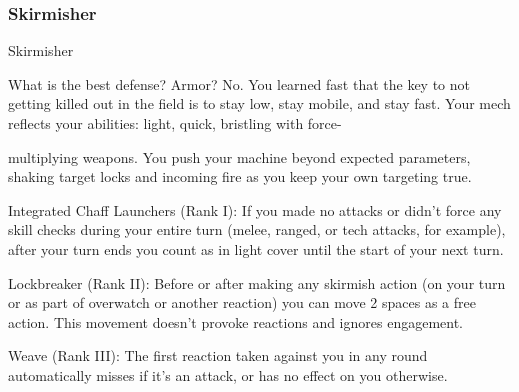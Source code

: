 \subsubsection{Skirmisher}

                                                   Skirmisher

What is the best defense? Armor? No. You learned fast that the key to not getting killed out in the field is to
stay low, stay mobile, and stay fast. Your mech reflects your abilities: light, quick, bristling with force-

multiplying weapons. You push your machine beyond expected parameters, shaking target locks and
incoming fire as you keep your own targeting true.

Integrated Chaff Launchers (Rank I): If you made no attacks or didn’t force any skill checks
during your entire turn (melee, ranged, or tech attacks, for example), after your turn ends you
count as in light cover until the start of your next turn.

Lockbreaker (Rank II): Before or after making any skirmish action (on your turn or as part of
overwatch or another reaction) you can move 2 spaces as a free action. This movement doesn’t
provoke reactions and ignores engagement.

Weave (Rank III): The first reaction taken against you in any round automatically misses if it’s an
attack, or has no effect on you otherwise.